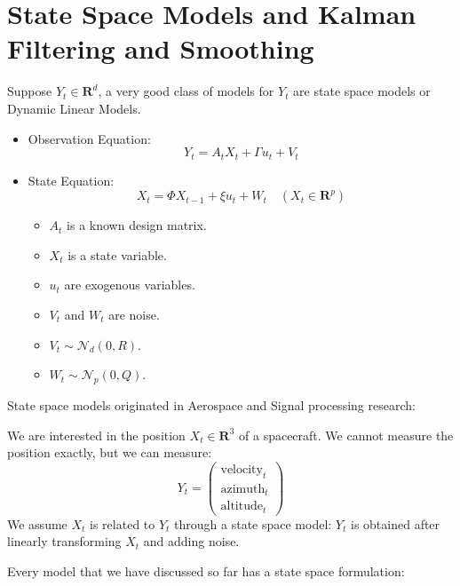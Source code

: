 \section{State Space Models and Kalman Filtering and Smoothing}
Suppose $ Y_t\in\mathbf{R}^d $, a very good class of models for $ Y_t $
are state space models or Dynamic Linear Models.
\begin{itemize}
    \item Observation Equation:
          \[ Y_t=A_t X_t+\Gamma u_t+V_t \]
    \item State Equation:
          \[ X_t=\Phi X_{t-1}+\xi u_t+W_t\quad(X_t\in\mathbf{R}^p) \]
          \begin{itemize}
              \item $ A_t $ is a known design matrix.
              \item $ X_t $ is a state variable.
              \item $ u_t $ are exogenous variables.
              \item $ V_t $ and $ W_t $ are noise.
              \item $ V_t \sim \mathcal{N}_d(0,R) $.
              \item $ W_t \sim \mathcal{N}_p(0,Q) $.
          \end{itemize}
\end{itemize}
State space models originated in Aerospace and Signal processing research:
\begin{Example}{}{}
    We are interested in the position $ X_t\in\mathbf{R}^3 $
    of a spacecraft. We cannot measure the position exactly, but we can measure:
    \[ Y_t=\begin{pmatrix}
            \text{velocity}_t \\
            \text{azimuth}_t  \\
            \text{altitude}_t
        \end{pmatrix} \]
    We assume $ X_t $ is related to $ Y_t $ through a state space model:
    $ Y_t $ is obtained after linearly transforming $ X_t $ and adding noise.
\end{Example}
Every model that we have discussed so far has a state space formulation:
